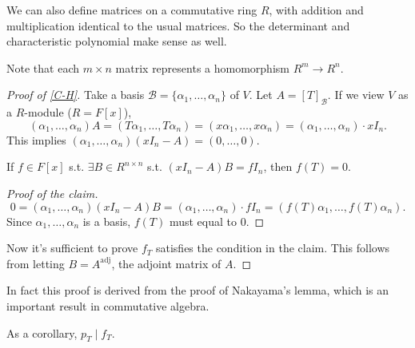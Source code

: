 We can also define matrices on a commutative ring $R$, with
addition and multiplication identical to the usual matrices.
So the determinant and characteristic polynomial make sense as well.

Note that each $m\times n$ matrix represents a homomorphism $R^m\to R^n$.

\begin{proof}[Proof of \autoref{C-H}]
    Take a basis $\mathcal{B}=\{\alpha_1,\dots,\alpha_n\}$ of $V$.
	Let $A = [T]_{\mathcal{B}}$. If we view $V$ as a $R$-module ($R=F[x]$),
	\[
		(\alpha_1,\dots,\alpha_n) A = (T\alpha_1,\dots, T\alpha_n)
		= (x\alpha_1,\dots,x\alpha_n) = (\alpha_1,\dots,\alpha_n)\cdot xI_n.
	\]
	This implies $(\alpha_1,\dots,\alpha_n) (xI_n - A) = (0,\dots,0)$.
	\begin{claim}
		If $f\in F[x]$ s.t. $\exists B\in R^{n \times n}$ s.t.
		$(xI_n - A)B = fI_n$, then  $f(T) = 0$.
	\end{claim}
	\begin{proof}[Proof of the claim]
		\[
			0 = (\alpha_1,\dots,\alpha_n)(xI_n-A)B =
			(\alpha_1,\dots,\alpha_n)\cdot fI_n = (f(T)\alpha_1,\dots,f(T)\alpha_n).
		\]
		Since $\alpha_1,\dots,\alpha_n$ is a basis, $f(T)$ must equal to $0$.
	\end{proof}

	Now it's sufficient to prove $f_T$ satisfies the condition in the claim.
	This follows from letting $B = A^\mathrm{adj}$, the adjoint matrix of $A$.
\end{proof}
\begin{remark}
    In fact this proof is derived from the proof of Nakayama's lemma,
	which is an important result in commutative algebra.
\end{remark}

As a corollary, $p_T\mid f_T$.
